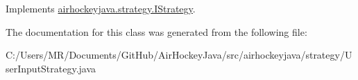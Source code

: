 Implements \hyperlink{interfaceairhockeyjava_1_1strategy_1_1_i_strategy_a28eb187bf61ef4bbd7d152f5856ce857}{airhockeyjava.\+strategy.\+I\+Strategy}.



The documentation for this class was generated from the following file\+:\begin{DoxyCompactItemize}
\item 
C\+:/\+Users/\+M\+R/\+Documents/\+Git\+Hub/\+Air\+Hockey\+Java/src/airhockeyjava/strategy/User\+Input\+Strategy.\+java\end{DoxyCompactItemize}
